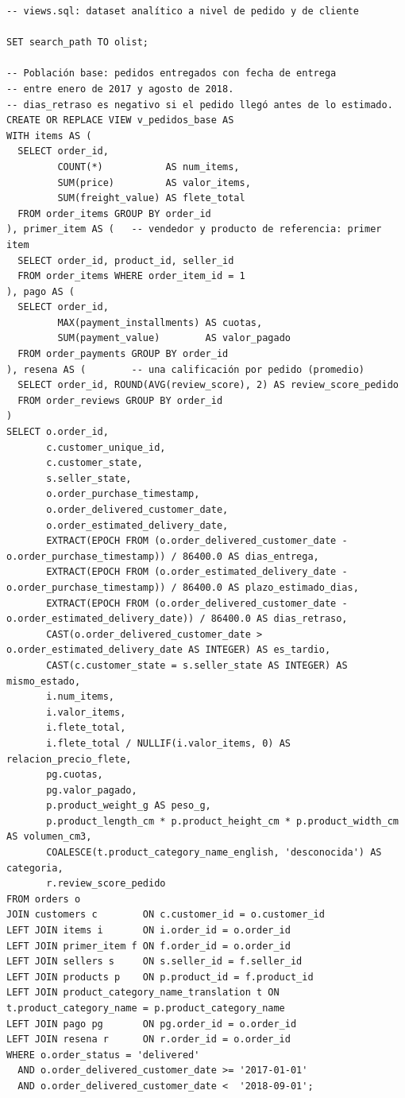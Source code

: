 \documentclass[a4paper,stu,12pt,donotrepeattitle,floatsintext]{apa7}
\begin{document}
\begin{lstlisting}
-- views.sql: dataset analítico a nivel de pedido y de cliente

SET search_path TO olist;

-- Población base: pedidos entregados con fecha de entrega
-- entre enero de 2017 y agosto de 2018.
-- dias_retraso es negativo si el pedido llegó antes de lo estimado.
CREATE OR REPLACE VIEW v_pedidos_base AS
WITH items AS (
  SELECT order_id,
         COUNT(*)           AS num_items,
         SUM(price)         AS valor_items,
         SUM(freight_value) AS flete_total
  FROM order_items GROUP BY order_id
), primer_item AS (   -- vendedor y producto de referencia: primer item
  SELECT order_id, product_id, seller_id
  FROM order_items WHERE order_item_id = 1
), pago AS (
  SELECT order_id,
         MAX(payment_installments) AS cuotas,
         SUM(payment_value)        AS valor_pagado
  FROM order_payments GROUP BY order_id
), resena AS (        -- una calificación por pedido (promedio)
  SELECT order_id, ROUND(AVG(review_score), 2) AS review_score_pedido
  FROM order_reviews GROUP BY order_id
)
SELECT o.order_id,
       c.customer_unique_id,
       c.customer_state,
       s.seller_state,
       o.order_purchase_timestamp,
       o.order_delivered_customer_date,
       o.order_estimated_delivery_date,
       EXTRACT(EPOCH FROM (o.order_delivered_customer_date - o.order_purchase_timestamp)) / 86400.0 AS dias_entrega,
       EXTRACT(EPOCH FROM (o.order_estimated_delivery_date - o.order_purchase_timestamp)) / 86400.0 AS plazo_estimado_dias,
       EXTRACT(EPOCH FROM (o.order_delivered_customer_date - o.order_estimated_delivery_date)) / 86400.0 AS dias_retraso,
       CAST(o.order_delivered_customer_date > o.order_estimated_delivery_date AS INTEGER) AS es_tardio,
       CAST(c.customer_state = s.seller_state AS INTEGER) AS mismo_estado,
       i.num_items,
       i.valor_items,
       i.flete_total,
       i.flete_total / NULLIF(i.valor_items, 0) AS relacion_precio_flete,
       pg.cuotas,
       pg.valor_pagado,
       p.product_weight_g AS peso_g,
       p.product_length_cm * p.product_height_cm * p.product_width_cm AS volumen_cm3,
       COALESCE(t.product_category_name_english, 'desconocida') AS categoria,
       r.review_score_pedido
FROM orders o
JOIN customers c        ON c.customer_id = o.customer_id
LEFT JOIN items i       ON i.order_id = o.order_id
LEFT JOIN primer_item f ON f.order_id = o.order_id
LEFT JOIN sellers s     ON s.seller_id = f.seller_id
LEFT JOIN products p    ON p.product_id = f.product_id
LEFT JOIN product_category_name_translation t ON t.product_category_name = p.product_category_name
LEFT JOIN pago pg       ON pg.order_id = o.order_id
LEFT JOIN resena r      ON r.order_id = o.order_id
WHERE o.order_status = 'delivered'
  AND o.order_delivered_customer_date >= '2017-01-01'
  AND o.order_delivered_customer_date <  '2018-09-01';


\end{lstlisting}
\end{document}
